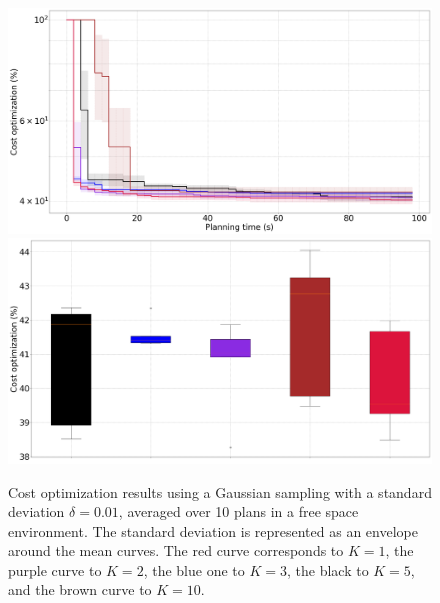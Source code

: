 \begin{figure} [htp]
    \centering
    \includegraphics[width=0.9\linewidth]{figures/appendix/gaussian_radius_0_01.png} \\
    \includegraphics[width=0.9\linewidth]{figures/appendix/bplot_gaussian_radius_0_01.png}
    \caption{Cost optimization results using a Gaussian sampling with a standard deviation $\delta = 0.01$, averaged over 10 plans in a free space environment. 
    The standard deviation is represented as an envelope around the mean curves.
    The red curve corresponds to $K = 1$, the purple curve to $K = 2$, the blue one to $K = 3$, the black to $K = 5$, and the brown curve to $K = 10$.}%
    \label{fig:gaussian_radius_0_01}%
\end{figure}

